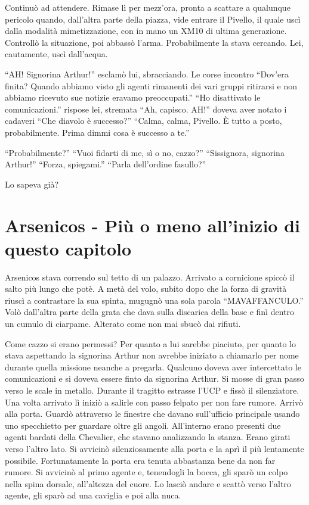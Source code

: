     Continuò ad attendere. Rimase lì per mezz'ora, pronta a scattare a qualunque pericolo quando, dall'altra parte della
    piazza, vide entrare il Pivello, il quale uscì dalla modalità mimetizzazione, con in mano un XM10 di ultima
    generazione. Controllò la situazione, poi abbassò l'arma. Probabilmente la stava cercando. Lei,
    cautamente, uscì dall'acqua.

    ``AH! Signorina Arthur!'' esclamò lui, sbracciando. Le corse incontro ``Dov'era finita? Quando abbiamo visto gli
    agenti rimanenti dei vari gruppi ritirarsi e non abbiamo ricevuto sue notizie eravamo preoccupati.'' ``Ho
    disattivato le comunicazioni.'' rispose lei, stremata ``Ah, capisco. AH!'' doveva aver notato i cadaveri ``Che
    diavolo è successo?'' ``Calma, calma, Pivello. È tutto a posto, probabilmente. Prima dimmi cosa è successo a te.''

    ``Probabilmente?'' ``Vuoi fidarti di me, sì o no, cazzo?'' ``Sissignora, signorina Arthur!'' ``Forza, spiegami.''
    ``Parla dell'ordine fasullo?''

    Lo sapeva già?

    
  \section*{Arsenicos - Più o meno all'inizio di questo capitolo}

    Arsenicos stava correndo sul tetto di un palazzo. Arrivato a cornicione spiccò il salto più lungo che potè. A metà
    del volo, subito dopo che la forza di gravità riuscì a contrastare la sua spinta, mugugnò una sola parola
    ``MAVAFFANCULO.'' Volò dall'altra parte della grata che dava sulla discarica della base e finì dentro un cumulo di
    ciarpame. Alterato come non mai sbucò dai rifiuti.

    Come cazzo si erano permessi? Per quanto a lui sarebbe piaciuto, per quanto lo stava aspettando la signorina Arthur
    non avrebbe iniziato a chiamarlo per nome durante quella missione neanche a pregarla. Qualcuno doveva aver
    intercettato le comunicazioni e si doveva essere finto da signorina Arthur. Si mosse di gran passo verso
    le scale in metallo. Durante il tragitto estrasse l'UCP e fissò il silenziatore. Una volta arrivato lì iniziò a
    salirle con passo felpato per non fare rumore. Arrivò alla porta. Guardò attraverso le finestre che davano
    sull'ufficio principale usando uno specchietto per guardare oltre gli angoli. All'interno erano presenti due agenti
    bardati della Chevalier, che stavano analizzando la stanza. Erano girati verso l'altro lato. Si avvicinò
    silenziosamente alla porta e la aprì il più lentamente possibile. Fortunatamente la porta era tenuta abbastanza bene
    da non far rumore. Si avvicinò al primo agente e, tenendogli la bocca, gli sparò un colpo nella spina dorsale,
    all'altezza del cuore. Lo lasciò andare e scattò verso l'altro agente, gli sparò ad una caviglia e poi alla nuca.

